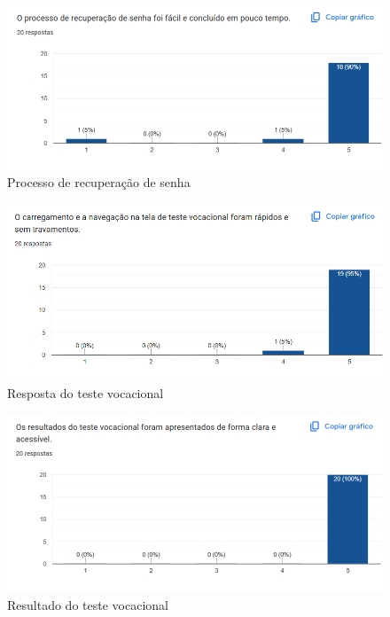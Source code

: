 \begin{apendicesenv}
\begin{figure}[H]
    \centering
    \includegraphics[width=1.0\linewidth]{images/recuperacao.png}
    \caption{Processo de recuperação de senha}
    \label{fig:senha}
\end{figure}

\begin{figure}[H]
    \centering
    \includegraphics[width=1.0\linewidth]{images/teste.png}
    \caption{Resposta do teste vocacional}
    \label{fig:teste}
\end{figure}

\begin{figure}[H]
    \centering
    \includegraphics[width=1.0\linewidth]{images/resultado.png}
    \caption{Resultado do teste vocacional}
    \label{fig:resultado}
\end{figure}


\end{apendicesenv}
